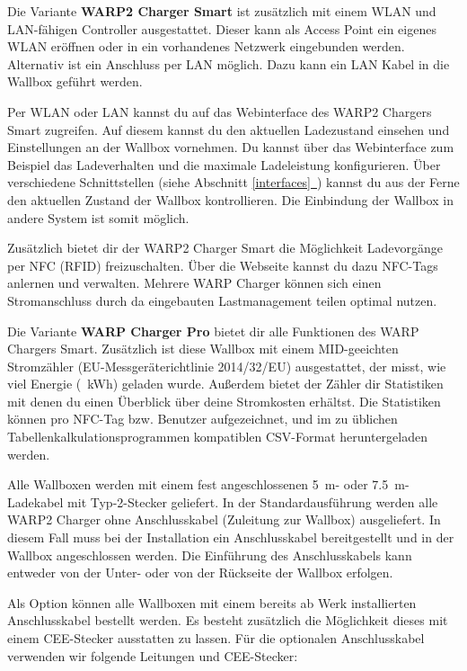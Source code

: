 \documentclass[a4paper,10pt]{article}
\newcommand*{\fullref}[1]{Abschnitt \hyperref[{#1}]{\ref*{#1}~\nameref*{#1}}}
\begin{document}
\begin{multicols*}{2}
    Die Variante \textbf{WARP2 Charger Smart} ist zusätzlich mit einem WLAN und
    LAN-fähigen Controller ausgestattet.
    Dieser kann als \nohyphens{Access} Point ein eigenes WLAN eröffnen oder in
    ein vorhandenes Netzwerk eingebunden werden. Alternativ ist ein Anschluss
    per LAN möglich. Dazu kann ein LAN Kabel in die Wallbox geführt werden.

    Per WLAN oder LAN kannst du auf das Webinterface des WARP2 Chargers Smart
    zugreifen. Auf diesem kannst du den aktuellen Ladezustand einsehen und
    Einstellungen an der Wallbox vornehmen. Du kannst über das Webinterface
    zum Beispiel das Ladeverhalten und die maximale Ladeleistung konfigurieren.
    Über verschiedene Schnittstellen (siehe \fullref{interfaces}) kannst du aus der Ferne den aktuellen Zustand
    der Wallbox kontrollieren. Die Einbindung der Wallbox in andere System ist somit möglich.

    Zusätzlich bietet dir der WARP2 Charger Smart die Möglichkeit Ladevorgänge
    per NFC (RFID) freizuschalten. Über die Webseite kannst du dazu NFC-Tags
    anlernen und verwalten. Mehrere WARP Charger können sich einen
    Stromanschluss durch da eingebauten Lastmanagement teilen optimal nutzen.

    Die Variante \textbf{WARP Charger Pro} bietet dir alle Funktionen des WARP Chargers Smart.
    Zusätzlich ist diese Wallbox mit einem MID-geeichten Stromzähler (EU-Messgeräterichtlinie 2014/32/EU)
    ausgestattet, der misst, wie viel Energie (\SI{}{\kWh}) geladen
    wurde. Außerdem bietet der Zähler dir Statistiken mit denen du einen Überblick über deine
    Stromkosten erhältst. Die Statistiken können pro NFC-Tag bzw. Benutzer aufgezeichnet,
    und im zu üblichen Tabellenkalkulationsprogrammen kompatiblen CSV-Format
    heruntergeladen werden.

    Alle Wallboxen werden mit einem fest angeschlossenen
    \SI{5}{\meter}- oder \SI{7,5}{\meter}-Ladekabel mit Typ-2-Stecker geliefert.
    In der Standardausführung werden alle WARP2 Charger ohne Anschlusskabel
    (Zuleitung zur Wallbox) ausgeliefert. In diesem Fall muss bei der Installation
    ein Anschlusskabel bereitgestellt und in der Wallbox angeschlossen werden.
    Die Einführung des Anschlusskabels kann entweder von der Unter- oder von
    der Rückseite der Wallbox erfolgen.

    Als Option können alle Wallboxen mit einem bereits ab Werk
    installierten Anschlusskabel bestellt werden. Es besteht zusätzlich die
    Möglichkeit dieses mit einem CEE-Stecker ausstatten zu lassen.
    Für die optionalen Anschluss\-kabel verwenden wir folgende Leitungen und CEE-Stecker:


\end{multicols*}
\end{document}
